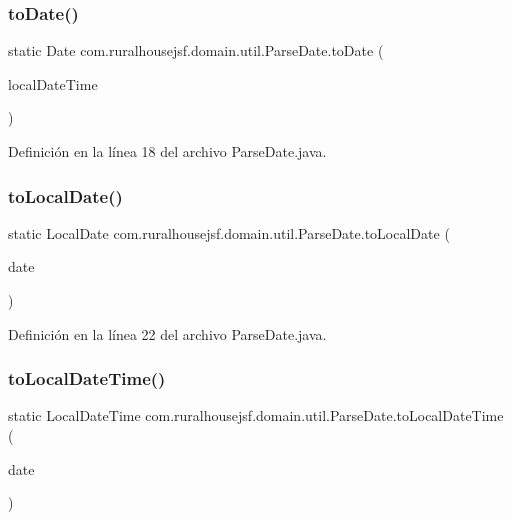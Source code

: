 \subsubsection{\texorpdfstring{toDate()}{toDate()}\hspace{0.1cm}{\footnotesize\ttfamily [2/2]}}
{\footnotesize\ttfamily static Date com.\+ruralhousejsf.\+domain.\+util.\+Parse\+Date.\+to\+Date (\begin{DoxyParamCaption}\item[{Local\+Date\+Time}]{local\+Date\+Time }\end{DoxyParamCaption})\hspace{0.3cm}{\ttfamily [static]}}



Definición en la línea 18 del archivo Parse\+Date.\+java.

\mbox{\label{classcom_1_1ruralhousejsf_1_1domain_1_1util_1_1_parse_date_ab162361ec67bde08f594d22c04ccc283}} 
\subsubsection{\texorpdfstring{toLocalDate()}{toLocalDate()}}
{\footnotesize\ttfamily static Local\+Date com.\+ruralhousejsf.\+domain.\+util.\+Parse\+Date.\+to\+Local\+Date (\begin{DoxyParamCaption}\item[{Date}]{date }\end{DoxyParamCaption})\hspace{0.3cm}{\ttfamily [static]}}



Definición en la línea 22 del archivo Parse\+Date.\+java.

\mbox{\label{classcom_1_1ruralhousejsf_1_1domain_1_1util_1_1_parse_date_aacf06ccd03aba32238d32068f0fe1ca2}} 
\subsubsection{\texorpdfstring{toLocalDateTime()}{toLocalDateTime()}}
{\footnotesize\ttfamily static Local\+Date\+Time com.\+ruralhousejsf.\+domain.\+util.\+Parse\+Date.\+to\+Local\+Date\+Time (\begin{DoxyParamCaption}\item[{Date}]{date }\end{DoxyParamCaption})\hspace{0.3cm}{\ttfamily [static]}}



